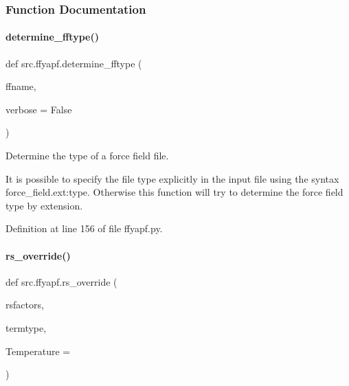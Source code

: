 \subsubsection{Function Documentation}
\mbox{\label{namespacesrc_1_1ffyapf_aac35f4253f397d2dc6cb5171acecb37e}} 
\paragraph{\texorpdfstring{determine\+\_\+fftype()}{determine\_fftype()}}
{\footnotesize\ttfamily def src.\+ffyapf.\+determine\+\_\+fftype (\begin{DoxyParamCaption}\item[{}]{ffname,  }\item[{}]{verbose = {\ttfamily False} }\end{DoxyParamCaption})}



Determine the type of a force field file. 

It is possible to specify the file type explicitly in the input file using the syntax \textquotesingle{}force\+\_\+field.\+ext\+:type\textquotesingle{}. Otherwise this function will try to determine the force field type by extension. 

Definition at line 156 of file ffyapf.\+py.

\mbox{\label{namespacesrc_1_1ffyapf_a45f8578b3e3eab55235478c820ea6b1f}} 
\paragraph{\texorpdfstring{rs\+\_\+override()}{rs\_override()}}
{\footnotesize\ttfamily def src.\+ffyapf.\+rs\+\_\+override (\begin{DoxyParamCaption}\item[{}]{rsfactors,  }\item[{}]{termtype,  }\item[{}]{Temperature = {} }\end{DoxyParamCaption})}



